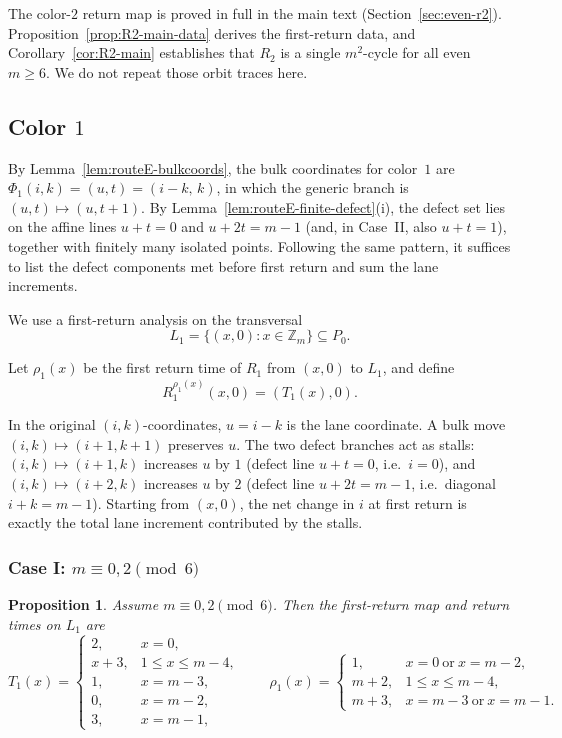 \documentclass[11pt]{article}
\newtheorem{proposition}{Proposition}
\newcommand{\Zm}{\mathbb Z_m}
\begin{document}
The color-$2$ return map is proved in full in the main text (Section~\ref{sec:even-r2}).
Proposition~\ref{prop:R2-main-data} derives the first-return data, and Corollary~\ref{cor:R2-main} establishes that $R_2$ is a single $m^2$-cycle for all even $m\ge 6$.
We do not repeat those orbit traces here.


\subsection{Color $1$}

By Lemma~\ref{lem:routeE-bulkcoords}, the bulk coordinates for color~$1$ are $\Phi_1(i,k)=(u,t)=(i-k,\,k)$, in which the generic branch is $(u,t)\mapsto(u,t+1)$.
By Lemma~\ref{lem:routeE-finite-defect}\textup{(i)}, the defect set lies on the affine lines $u+t=0$ and $u+2t=m-1$ (and, in Case~II, also $u+t=1$), together with finitely many isolated points.
Following the same pattern, it suffices to list the defect components met before first return and sum the lane increments.

We use a first-return analysis on the transversal
\[
L_1=\{(x,0):x\in \Zm\}\subseteq P_0.
\]

Let $\rho_1(x)$ be the first return time of $R_1$ from $(x,0)$ to $L_1$, and define
\[
R_1^{\rho_1(x)}(x,0)=(T_1(x),0).
\]

In the original $(i,k)$-coordinates, $u=i-k$ is the lane coordinate.
A bulk move $(i,k)\mapsto(i+1,k+1)$ preserves $u$.
The two defect branches act as stalls: $(i,k)\mapsto(i+1,k)$ increases $u$ by $1$ (defect line $u+t=0$, i.e.\ $i=0$), and $(i,k)\mapsto(i+2,k)$ increases $u$ by $2$ (defect line $u+2t=m-1$, i.e.\ diagonal $i+k=m-1$).
Starting from $(x,0)$, the net change in $i$ at first return is exactly the total lane increment contributed by the stalls.

\subsubsection{Case I: $m\equiv 0,2\pmod 6$}

\begin{proposition}\label{prop:R1-caseI}
Assume $m\equiv 0,2\pmod 6$.
Then the first-return map and return times on $L_1$ are
\[
T_1(x)=
\begin{cases}
2,&x=0,\\
x+3,&1\le x\le m-4,\\
1,&x=m-3,\\
0,&x=m-2,\\
3,&x=m-1,
\end{cases}
\qquad
\rho_1(x)=
\begin{cases}
1,&x=0\ \text{or}\ x=m-2,\\
m+2,&1\le x\le m-4,\\
m+3,&x=m-3\ \text{or}\ x=m-1.
\end{cases}
\]
\end{proposition}
\end{document}
